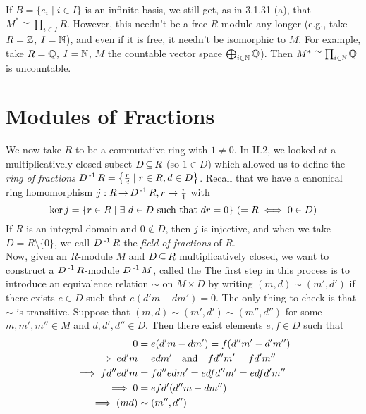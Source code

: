 \documentclass[11pt]{book}
\theoremstyle{definition}   \newtheorem{defn}[counter]{Definition} %
\newcommand{\bs}{\setminus}   \newcommand{\A}{\mathcal{A}}   \newcommand{\sy}{\textnormal{Syl}}   \newcommand{\size}[1]{\left| #1 \right|}
\DeclareMathOperator{\ra}{\rightarrow}   \DeclareMathOperator{\Poly}{\mathbf{P}}   \DeclareMathOperator{\spn}{\textnormal{span}}   \DeclareMathOperator{\aut}{\textnormal{Aut}}
\newcommand{\vs}{\vspace{8pt}}
\numberwithin{counter}{chapter}
\begin{document}
\vs

\begin{remark}
If $B = \{e_i \mid i \in I \}$ is an infinite basis, we still get, as in 3.1.31 (a), that $M^* \cong \prod_{i \in I} R$. However, this needn't be a free $R$-module any longer (e.g., take $R = \operatorname{\mathbb{Z}}$, $I = \operatorname{\mathbb{N}}$), and even if it is free, it needn't be isomorphic to $M$. For example, take $R = \operatorname{\mathbb{Q}}$, $I = \operatorname{\mathbb{N}}$, $M$ the countable vector space $\bigoplus_{i \in \operatorname{\mathbb{N}}} \operatorname{\mathbb{Q}}$). Then $M^* \cong \prod_{i \in \operatorname{\mathbb{N}}} \operatorname{\mathbb{Q}}$ is uncountable.
\end{remark}

\vs





\chapter{\null \quad Modules of Fractions}

We now take $R$ to be a commutative ring with $1 \ne 0$. In II.2, we looked at a multiplicatively closed subset $D \operatorname{\subseteq} R$ (so $1 \in D$) which allowed us to define the \emph{ring of fractions} $D\operatorname{^{-1}} R = \left\{\frac{r}{d} \mid r \in R, d \in D\right\}$. Recall that we have a canonical ring homomorphism $j : R \ra D\inv R, r \mapsto \frac{r}{1}$ with
	\[\ker j = \{r \in R \mid \exists \ d \in D \textnormal{ such that } dr = 0\} \ (= R \iff 0 \in D) \]
If $R$ is an integral domain and $0 \notin D$, then $j$ is injective, and when we take $D = R \bs \{0\}$, we call $D\operatorname{^{-1}} R$ the \emph{field of fractions} of $R$. \\

Now, given an $R$-module $M$ and $D \operatorname{\subseteq} R$ multiplicatively closed, we want to construct a $D\operatorname{^{-1}} R$-module $D\operatorname{^{-1}} M$, called the  The first step in this process is to introduce an equivalence relation $\sim$ on $M \times D$ by writing $(m,d) \sim (m',d')$ if there exists $e \in D$ such that $e(d'm - dm') = 0$. The only thing to check is that $\sim$ is transitive. Suppose that $(m,d) \sim (m',d') \sim (m'',d'')$ for some $m,m',m'' \in M$ and $d,d',d'' \in D$. Then there exist elements $e,f \in D$ such that
\begin{align*}
0 &= e(d'm - dm') = f(d''m' - d'm'') \\
\implies ed'm &= edm' \quad \textnormal{and} \quad fd''m' = fd'm'' \\
\implies fd''ed'm &= fd''edm' = edfd''m' = edfd'm'' \\
\implies 0 &= efd'(d''m-dm'') \\
\implies (md) &\sim (m'',d'')
\end{align*}
\end{document}
